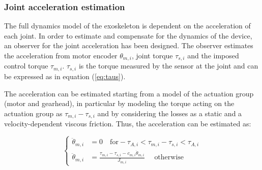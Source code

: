 



\subsubsection{Joint acceleration estimation}  \label{acc_observer}

The full dynamics model of the exoskeleton  is dependent on the acceleration of each joint. In order to estimate and compensate for the dynamics of the device, an observer for the joint acceleration has been designed. 
The observer estimates the acceleration from motor encoder $\theta_{m,i}$,  joint torque $\tau_{s,i}$ and the imposed control torque $\tau_{m,i}$.
$\tau_{s,i}$ is the torque measured by the sensor at the joint and can be expressed as in equation (\ref{eq:taus}).

The acceleration can be estimated starting from a model of the actuation group (motor and gearhead), in particular by modeling the torque acting on the actuation group as $\tau_{m,i}-\tau_{s,i}$ and by considering the losses as a static and a velocity-dependent viscous friction. Thus, the acceleration can be estimated as:




\begin{equation}
\left \{
\begin{aligned}
\ddot{\theta}_{m,i} & =0 \quad \text{for} -\tau_{A,i}<\tau_{m,i}-\tau_{s,i}<\tau_{A,i} \\
\ddot{\theta}_{m,i} & =\frac{\tau_{m,i}-\tau_{s,i}  -c_{m,i}\dot{\theta}_{m,i}}{J_{m,i}} \quad \text{ otherwise}
\end{aligned}
\right .
\label{tau_acc}
\end{equation}

